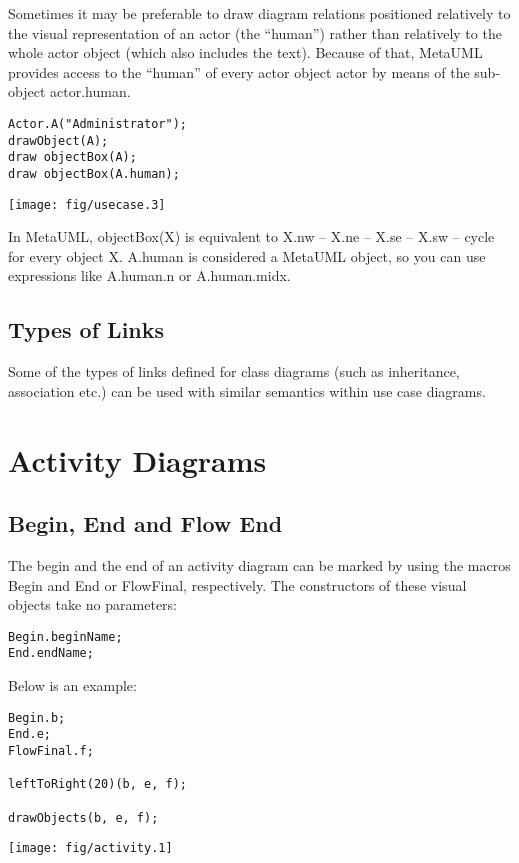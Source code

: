 \documentclass{article}
\newcommand{\code}{\ttfamily}
\begin{document}
Sometimes it may be preferable to draw diagram relations positioned relatively to
the visual representation of an actor (the ``human'') rather than relatively to the whole
actor object (which also includes the text). Because of that, MetaUML provides access
to the ``human'' of every actor object {\code actor} by means of the sub-object {\code actor.human}.

\begin{multicols}{2}
\begin{verbatim}
Actor.A("Administrator");
drawObject(A);
draw objectBox(A);
draw objectBox(A.human);
\end{verbatim}
\columnbreak
\hspace{1cm}\texttt{[image: fig/usecase.3]}
\end{multicols}

In MetaUML, {\code objectBox(X)} is equivalent to {\code X.nw -- X.ne -- X.se -- X.sw -- cycle} for every object {\code X}. {\code A.human} is considered a MetaUML object, so you can use expressions like {\code A.human.n} or {\code A.human.midx}.

\subsection{Types of Links}

Some of the types of links defined for class diagrams (such as inheritance, association etc.) can be used with similar semantics within use case diagrams.

\section{Activity Diagrams}

\subsection{Begin, End and Flow End}

The begin and the end of an activity diagram can be marked by using the macros {\code Begin}
and {\code End} or {\code FlowFinal}, respectively. The constructors of these visual objects take no parameters:

\begin{verbatim}
Begin.beginName;
End.endName;
\end{verbatim}

Below is an example:

\begin{multicols}{2}
\begin{verbatim}
Begin.b;
End.e;
FlowFinal.f;

leftToRight(20)(b, e, f);

drawObjects(b, e, f);
\end{verbatim}
\columnbreak
\hspace{1cm}\texttt{[image: fig/activity.1]}
\end{multicols}
\end{document}
